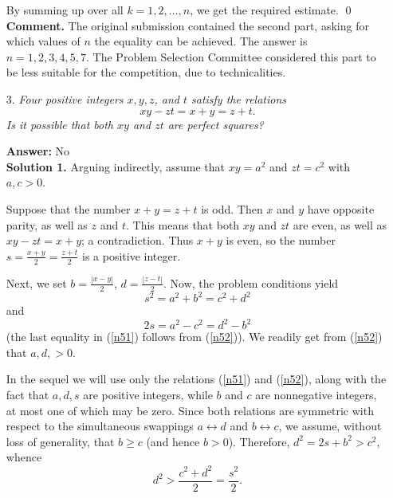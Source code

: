 \documentclass[a4paper, 12pt]{article}
\begin{document}
\begin{enumerate}
By summing up over all $k = 1, 2, \dots, n$, we get the required estimate. \qed \\

\textbf{Comment. } The original submission contained the second part, asking for which values of $n$ the equality can be achieved.  The answer is $n = 1, 2, 3, 4, 5, 7$. The Problem Selection Committee considered this part to be less suitable for the competition, due to technicalities.


\vspace{5mm}
\item[3.]  \textit{Four positive integers $x, y, z$, and $t$ satisfy the relations
$$ xy - zt = x + y = z + t. $$
Is it possible that both $xy$ and $zt$ are perfect squares?}
 \vspace{5mm}

\textbf{Answer: } No \\

\textbf{Solution 1. } Arguing indirectly, assume that $xy = a^2$ and $zt = c^2$ with $a, c > 0$.

Suppose that the number $x+y = z+t$ is odd. Then $x$ and $y$ have opposite parity, as well as $z$ and $t$.  This means that both $xy$ and $zt$ are even, as well as $xy - zt = x + y$; a contradiction. Thus $x+y$ is even, so the number $s = \frac{x+y}{2} = \frac{z+t}{2}$ is a positive integer. 

Next, we set $b = \frac{|x-y|}{2}$, $d = \frac{|z-t|}{2}$. Now, the problem conditions yield
\begin{equation} \label{n51}
    s^2 = a^2 + b^2 = c^2 + d^2
\end{equation}
and
\begin{equation} \label{n52}
    2s = a^2 - c^2 = d^2 - b^2
\end{equation}
(the last equality in (\ref{n51}) follows from (\ref{n52})). We readily get from (\ref{n52}) that $a, d, > 0$.

In the sequel we will use only the relations (\ref{n51}) and (\ref{n52}), along with the fact that $a, d, s$ are positive integers, while $b$ and $c$ are nonnegative integers, at most one of which may be zero.  Since both relations are symmetric with respect to the simultaneous swappings $a \leftrightarrow d$ and $b \leftrightarrow c$, we assume, without loss of generality, that $b \geq c$ (and hence $b > 0$). Therefore, $d^2 = 2s + b^2 > c^2$, whence
\begin{equation} \label{n53}
    d^2 > \frac{c^2 + d^2}{2} = \frac{s^2}{2}.
\end{equation}


\end{enumerate}
\end{document}
